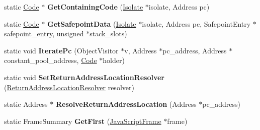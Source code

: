 \begin{DoxyCompactItemize}
\item 
static \hyperlink{classv8_1_1internal_1_1_code}{Code} $\ast$ {\bfseries Get\+Containing\+Code} (\hyperlink{classv8_1_1internal_1_1_isolate}{Isolate} $\ast$isolate, Address pc)\hypertarget{classv8_1_1internal_1_1_b_a_s_e___e_m_b_e_d_d_e_d_a05a5c0b6a4ee5a432785bdf2f46b7695}{}\label{classv8_1_1internal_1_1_b_a_s_e___e_m_b_e_d_d_e_d_a05a5c0b6a4ee5a432785bdf2f46b7695}

\item 
static \hyperlink{classv8_1_1internal_1_1_code}{Code} $\ast$ {\bfseries Get\+Safepoint\+Data} (\hyperlink{classv8_1_1internal_1_1_isolate}{Isolate} $\ast$isolate, Address pc, Safepoint\+Entry $\ast$safepoint\+\_\+entry, unsigned $\ast$stack\+\_\+slots)\hypertarget{classv8_1_1internal_1_1_b_a_s_e___e_m_b_e_d_d_e_d_af5c4ed5edf4164aa139ec8c5e8435620}{}\label{classv8_1_1internal_1_1_b_a_s_e___e_m_b_e_d_d_e_d_af5c4ed5edf4164aa139ec8c5e8435620}

\item 
static void {\bfseries Iterate\+Pc} (Object\+Visitor $\ast$v, Address $\ast$pc\+\_\+address, Address $\ast$constant\+\_\+pool\+\_\+address, \hyperlink{classv8_1_1internal_1_1_code}{Code} $\ast$holder)\hypertarget{classv8_1_1internal_1_1_b_a_s_e___e_m_b_e_d_d_e_d_a79d87ccf76fd163052749ee1386200eb}{}\label{classv8_1_1internal_1_1_b_a_s_e___e_m_b_e_d_d_e_d_a79d87ccf76fd163052749ee1386200eb}

\item 
static void {\bfseries Set\+Return\+Address\+Location\+Resolver} (\hyperlink{namespacev8_a8ce54c75241be41ff6a25e9944eefd2a}{Return\+Address\+Location\+Resolver} resolver)\hypertarget{classv8_1_1internal_1_1_b_a_s_e___e_m_b_e_d_d_e_d_ad703da4eb60b0535f145b1d273d65520}{}\label{classv8_1_1internal_1_1_b_a_s_e___e_m_b_e_d_d_e_d_ad703da4eb60b0535f145b1d273d65520}

\item 
static Address $\ast$ {\bfseries Resolve\+Return\+Address\+Location} (Address $\ast$pc\+\_\+address)\hypertarget{classv8_1_1internal_1_1_b_a_s_e___e_m_b_e_d_d_e_d_ac20ab462222705ea6ca2fe6695747d80}{}\label{classv8_1_1internal_1_1_b_a_s_e___e_m_b_e_d_d_e_d_ac20ab462222705ea6ca2fe6695747d80}

\item 
static Frame\+Summary {\bfseries Get\+First} (\hyperlink{classv8_1_1internal_1_1_java_script_frame}{Java\+Script\+Frame} $\ast$frame)\hypertarget{classv8_1_1internal_1_1_b_a_s_e___e_m_b_e_d_d_e_d_a58247594fd8d8fc736577c85f40d7bad}{}\label{classv8_1_1internal_1_1_b_a_s_e___e_m_b_e_d_d_e_d_a58247594fd8d8fc736577c85f40d7bad}


\end{DoxyCompactItemize}
